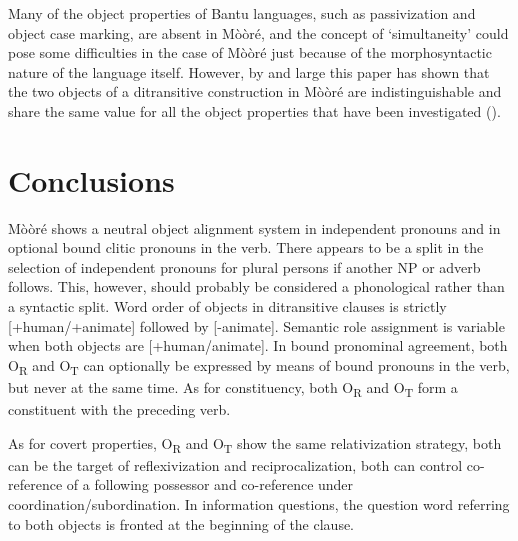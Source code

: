 \documentclass[output=paper]{langsci/langscibook}
\begin{document}
Many of the object properties of Bantu languages, such as passivization and object case marking, are absent in M\`{o}\`{o}r\'{e}, and the concept of `simultaneity' could pose some difficulties in the case of M\`{o}\`{o}r\'{e} just because of the morphosyntactic nature of the language itself. However, by and large this paper has shown that the two objects of a ditransitive construction in M\`{o}\`{o}r\'{e} are indistinguishable and share the same value for all the object properties that have been investigated ().  

\section{Conclusions}\label{§7:conclusions.pacchiarotti}

M\`{o}\`{o}r\'{e} shows a neutral object alignment system in independent pronouns and in optional bound clitic pronouns in the verb. There appears to be a split in the selection of independent pronouns for plural persons if another NP or adverb follows. This, however, should probably be considered a phonological rather than a syntactic split. Word order of objects in ditransitive clauses is strictly [+human/+animate] followed by [-animate]. Semantic role assignment is variable when both objects are [+human/animate]. In bound pronominal agreement, both O\textsubscript{R} and O\textsubscript{T} can optionally be expressed by means of bound pronouns in the verb, but never at the same time. As for constituency, both O\textsubscript{R} and O\textsubscript{T} form a constituent with the preceding verb. 

As for covert properties, O\textsubscript{R} and O\textsubscript{T} show the same relativization strategy, both can be the target of reflexivization and reciprocalization, both can control co-reference of a following possessor and co-reference under coordination/subordination. In information questions, the question word referring to both objects is fronted at the beginning of the clause. 
\end{document}
